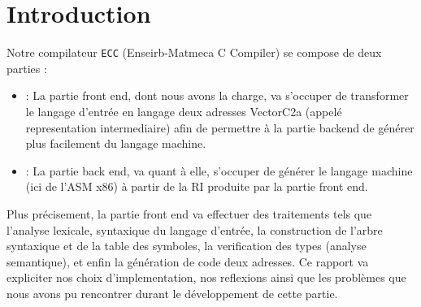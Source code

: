 \newpage
\section*{Introduction}

Notre compilateur \verb?ECC? (Enseirb-Matmeca C Compiler) se compose de deux parties :

\begin{itemize}
\item : La partie front end, dont nous avons la charge, va s'occuper de transformer le langage d'entrée en langage deux adresses VectorC2a (appelé representation intermediaire) afin de permettre à la partie backend de générer plus facilement du langage machine.
\item : La partie back end, va quant à elle, s'occuper de générer le langage machine (ici de l'ASM x86) à partir de la RI produite par la partie front end.

\end{itemize}


Plus précisement, la partie front end va effectuer des traitements tels que l'analyse lexicale, syntaxique du langage d'entrée, la construction de l'arbre syntaxique et de la table des symboles, la verification des types (analyse semantique), et enfin la génération de code deux adresses.
Ce rapport va expliciter nos choix d'implementation, nos reflexions ainsi que les problèmes que nous avons pu rencontrer durant le développement de cette partie.
		
